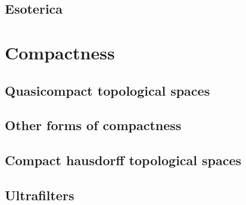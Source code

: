 \documentclass[a4paper,nobib,nols]{tufte-book}
\begin{document}


\section{Esoterica}%
\label{sec:esoterica}



\chapter{Compactness}%
\label{cha:compactness}

\section{Quasicompact topological spaces}%
\label{sec:quasicompact_topological_spaces}

\section{Other forms of compactness}%
\label{sec:other_forms_of_compactness}

\section{Compact hausdorff topological spaces}%
\label{sec:compact_hausdorff_topological_spaces}

\section{Ultrafilters}%
\label{sec:ultrafilters}
\end{document}
